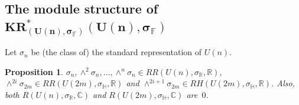 \documentclass[pdftex]{sigma}
\numberwithin{equation}{section}
\newtheorem{Proposition}[Theorem]{Proposition}
{\theoremstyle{definition}
\newtheorem{Definition}[Theorem]{Definition}
\newtheorem{Example}[Theorem]{Example}
\newtheorem{Remark}[Theorem]{Remark}
}
\begin{document}
\subsection[The module structure of $KR^*_{(U(n), \sigma_\mathbb{F})}(U(n),\sigma_\mathbb{F})$]{The
module structure of $\boldsymbol{KR^*_{(U(n), \sigma_\mathbb{F})}(U(n),\sigma_\mathbb{F})}$}

\begin{Definition}
Let $\sigma_n$ be (the class of) the standard representation of $U(n)$.
\end{Definition}

\begin{Proposition}
\label{realrepunitary}
$\sigma_n,\wedge^2\sigma_n, \dots, \wedge^n\sigma_n\in RR(U(n), \sigma_\mathbb{R}, \mathbb{R})$, $\wedge^{2i}
\sigma_{2m}
\in RR(U(2m),
\sigma_\mathbb{H}, \mathbb{R})$ and $\wedge^{2i+1}
\sigma_{2m}
\in RH(U(2m),
\sigma_\mathbb{H}, \mathbb{R})$.
Also, both $R(U(n),
\sigma_\mathbb{R}, \mathbb{C})$ and $R(U(2m),
\sigma_\mathbb{H}, \mathbb{C})$ are~$0$.
\end{Proposition}
\end{document}

